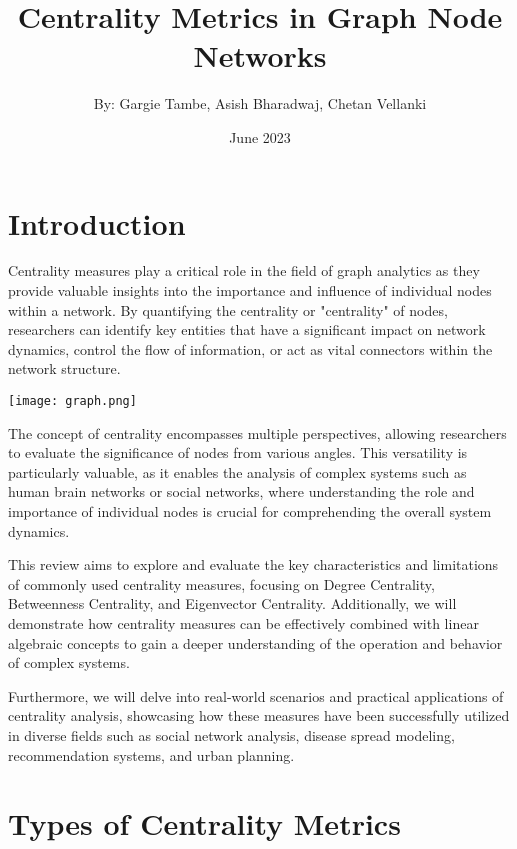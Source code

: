 \documentclass{article}
\title{Centrality Metrics in Graph Node Networks}
\author{By: Gargie Tambe, Asish Bharadwaj, Chetan Vellanki}
\date{June 2023}
\begin{document}
\maketitle

\section*{Introduction}
Centrality measures play a critical role in the field of graph analytics as they provide valuable insights into the importance and influence of individual nodes within a network. By quantifying the centrality or "centrality" of nodes, researchers can identify key entities that have a significant impact on network dynamics, control the flow of information, or act as vital connectors within the network structure.

\begin{center}
    \texttt{[image: graph.png]}  
\end{center}

The concept of centrality encompasses multiple perspectives, allowing researchers to evaluate the significance of nodes from various angles. This versatility is particularly valuable, as it enables the analysis of complex systems such as human brain networks or social networks, where understanding the role and importance of individual nodes is crucial for comprehending the overall system dynamics.

This review aims to explore and evaluate the key characteristics and limitations of commonly used centrality measures, focusing on Degree Centrality, Betweenness Centrality, and Eigenvector Centrality. Additionally, we will demonstrate how centrality measures can be effectively combined with linear algebraic concepts to gain a deeper understanding of the operation and behavior of complex systems.

Furthermore, we will delve into real-world scenarios and practical applications of centrality analysis, showcasing how these measures have been successfully utilized in diverse fields such as social network analysis, disease spread modeling, recommendation systems, and urban planning.

\section*{Types of Centrality Metrics}
\end{document}
